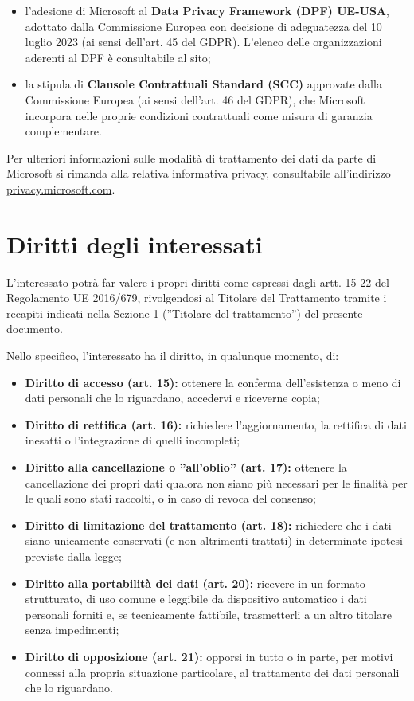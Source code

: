 \documentclass[legal]{polinetwork}
\begin{document}
\begin{itemize}
	\item l’adesione di Microsoft al \textbf{Data Privacy Framework (DPF) UE-USA}, adottato dalla Commissione Europea con decisione di adeguatezza del 10 luglio 2023 (ai sensi dell’art. 45 del GDPR). L’elenco delle organizzazioni aderenti al DPF è consultabile al sito;
	\item la stipula di \textbf{Clausole Contrattuali Standard (SCC)} approvate dalla Commissione Europea (ai sensi dell’art. 46 del GDPR), che Microsoft incorpora nelle proprie condizioni contrattuali come misura di garanzia complementare.
\end{itemize}

Per ulteriori informazioni sulle modalità di trattamento dei dati da parte di Microsoft si rimanda alla relativa informativa privacy, consultabile all’indirizzo \href{https://privacy.microsoft.com}{privacy.microsoft.com}.

\section{Diritti degli interessati}

L’interessato potrà far valere i propri diritti come espressi dagli artt. 15-22 del Regolamento UE 2016/679, rivolgendosi al Titolare del Trattamento tramite i recapiti indicati nella Sezione 1 (”Titolare del trattamento”) del presente documento.

Nello specifico, l’interessato ha il diritto, in qualunque momento, di:
\begin{itemize}
	\item \textbf{Diritto di accesso (art. 15):} ottenere la conferma dell’esistenza o meno di dati personali che lo riguardano, accedervi e riceverne copia;
	\item \textbf{Diritto di rettifica (art. 16):} richiedere l’aggiornamento, la rettifica di dati inesatti o l’integrazione di quelli incompleti;
	\item \textbf{Diritto alla cancellazione o ”all’oblio” (art. 17):} ottenere la cancellazione dei propri dati qualora non siano più necessari per le finalità per le quali sono stati raccolti, o in caso di revoca del consenso;
	\item \textbf{Diritto di limitazione del trattamento (art. 18):} richiedere che i dati siano unicamente conservati (e non altrimenti trattati) in determinate ipotesi previste dalla legge;
	\item \textbf{Diritto alla portabilità dei dati (art. 20):} ricevere in un formato strutturato, di uso comune e leggibile da dispositivo automatico i dati personali forniti e, se tecnicamente fattibile, trasmetterli a un altro titolare senza impedimenti;
	\item \textbf{Diritto di opposizione (art. 21):} opporsi in tutto o in parte, per motivi connessi alla propria situazione particolare, al trattamento dei dati personali che lo riguardano.
\end{itemize}
\end{document}

